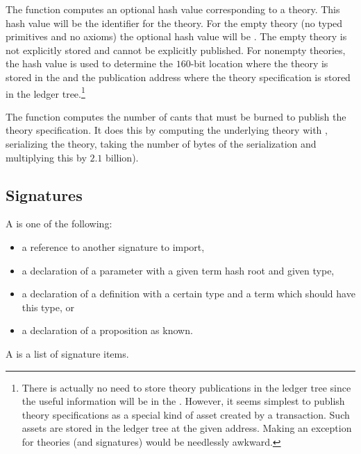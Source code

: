 The function {} computes an optional hash value corresponding to a theory.
This hash value will be the identifier for the theory.
For the empty theory (no typed primitives and no axioms) the optional hash value will be {}.
The empty theory is not explicitly stored and cannot be explicitly published.
For nonempty theories, the hash value is used to determine the $160$-bit location
where the theory is stored in the {}
and the publication address where the theory specification is stored in the ledger tree.\footnote{There is actually no need to store theory publications in the ledger tree since the useful information will be in the {}. However, it seems simplest to publish theory specifications as a special kind of asset created by a transaction. Such assets are stored in the ledger tree at the given address. Making an exception for theories (and signatures) would be needlessly awkward.}

The function {} computes the number of cants that must be burned
to publish the theory specification. It does this by computing the underlying theory with {},
serializing the theory, taking the number of bytes of the serialization and multiplying this by
$2.1$ billion).


\subsection{Signatures}

A {} is one of the following:
\begin{itemize}
\item a reference to another signature to import,
\item a declaration of a parameter with a given term hash root and given type,
\item a declaration of a definition with a certain type and a term which should have this type, or
\item a declaration of a proposition as known.
\end{itemize}
A {} is a list of signature items.

